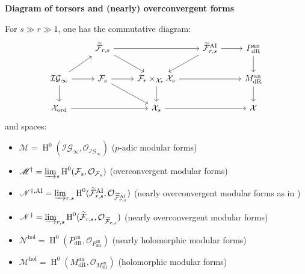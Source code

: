 \documentclass[10pt, oneside]{amsart}
\renewcommand{\tilde}{\widetilde}
\numberwithin{equation}{subsection}
\theoremstyle{definition}
\theoremstyle{remark}
\newcommand{\opn}[1]{\operatorname{#1}}
\begin{document}
\vspace{0.3cm}

\begin{center}
    \textbf{Diagram of torsors and (nearly) overconvergent forms}
\end{center}

\vspace{0.3cm}

For $s \gg r \gg 1$, one has the commutative diagram:
\[
\begin{tikzcd}
                                                     & {\tilde{\mathcal{F}}_{r, s}} \arrow[rr] \arrow[rd] &                                                                         & {\tilde{\mathcal{F}}_{r, s}^{\opn{AI}}} \arrow[ld] \arrow[r] & P_{\opn{dR}}^{\opn{an}} \arrow[d] \\
\mathcal{IG}_{\infty} \arrow[d] \arrow[ru] \arrow[r] & \mathcal{F}_s \arrow[r] \arrow[rd]                 & \mathcal{F}_r \times_{\mathcal{X}_r} \mathcal{X}_s \arrow[d] \arrow[rr] &                                                              & M_{\opn{dR}}^{\opn{an}} \arrow[d] \\
\mathcal{X}_{\opn{ord}} \arrow[rr]                   &                                                    & \mathcal{X}_s \arrow[rr]                                                &                                                              & \mathcal{X}                      
\end{tikzcd}
\]
and spaces: 
\begin{itemize}
    \item $\mathscr{M} = \opn{H}^0(\mathcal{IG}_{\infty}, \mathcal{O}_{\mathcal{IG}_{\infty}})$ ($p$-adic modular forms)
    \item $\mathscr{M}^{\dagger} = \varinjlim_s \opn{H}^0(\mathcal{F}_s, \mathcal{O}_{\mathcal{F}_s})$ (overconvergent modular forms)
    \item $\mathscr{N}^{\dagger, \opn{AI}} = \varinjlim_{r, s} \opn{H}^0(\tilde{\mathcal{F}}^{\opn{AI}}_{r, s}, \mathcal{O}_{\tilde{\mathcal{F}}^{\opn{AI}}_{r, s}})$ (nearly overconvergent modular forms as in \cite{AI_LLL})
    \item $\mathscr{N}^{\dagger} = \varinjlim_{r, s} \opn{H}^0(\tilde{\mathcal{F}}_{r, s}, \mathcal{O}_{\tilde{\mathcal{F}}_{r, s}})$ (nearly overconvergent modular forms)
    \item $\mathscr{N}^{\opn{hol}} = \opn{H}^0( P_{\opn{dR}}^{\opn{an}}, \mathcal{O}_{P_{\opn{dR}}^{\opn{an}}})$ (nearly holomorphic modular forms)
    \item $\mathscr{M}^{\opn{hol}} = \opn{H}^0( M_{\opn{dR}}^{\opn{an}}, \mathcal{O}_{M_{\opn{dR}}^{\opn{an}}})$ (holomorphic modular forms)
\end{itemize}
\end{document}
